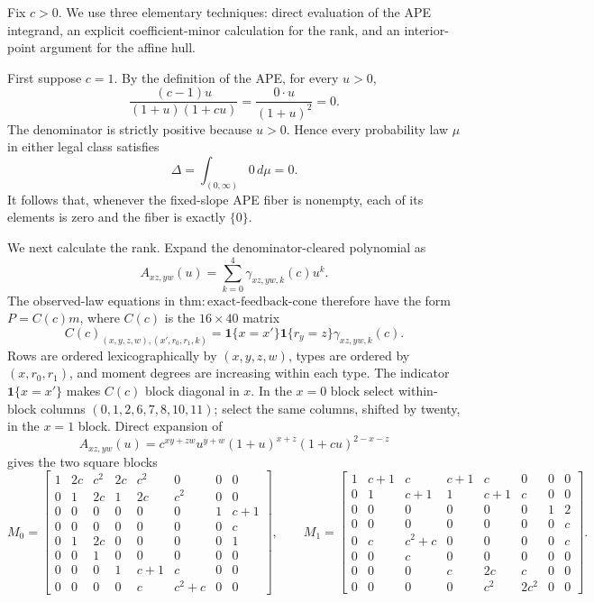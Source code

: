 Fix \(c>0\).  We use three elementary techniques: direct evaluation of the
APE integrand, an explicit coefficient-minor calculation for the rank, and an
interior-point argument for the affine hull.

First suppose \(c=1\).  By the definition of the APE, for every \(u>0\),
\[
 \frac{(c-1)u}{(1+u)(1+cu)}
 =\frac{0\cdot u}{(1+u)^2}=0.
\]
The denominator is strictly positive because \(u>0\).  Hence every probability
law \(\mu\) in either legal class satisfies
\[
 \Delta=\int_{(0,\infty)}0\,d\mu=0.
\]
It follows that, whenever the fixed-slope APE fiber is nonempty, each of its
elements is zero and the fiber is exactly \(\{0\}\).

We next calculate the rank.  Expand the denominator-cleared polynomial as
\[
 A_{xz,yw}(u)=\sum_{k=0}^4
 \gamma_{xz,yw,k}(c)u^k.
\]
The observed-law equations in \(\mathrm{thm{:}exact\text{-}feedback\text{-}cone}\)
therefore have the form \(P=C(c)m\), where \(C(c)\) is the
\(16\times40\) matrix
\[
 C(c)_{(x,y,z,w),(x',r_0,r_1,k)}
 =\mathbf 1\{x=x'\}\mathbf 1\{r_y=z\}
   \gamma_{xz,yw,k}(c).
\]
Rows are ordered lexicographically by \((x,y,z,w)\), types are ordered by
\((x,r_0,r_1)\), and moment degrees are increasing within each type.  The
indicator \(\mathbf 1\{x=x'\}\) makes \(C(c)\) block diagonal in \(x\).
In the \(x=0\) block select within-block columns
\((0,1,2,6,7,8,10,11)\); select the same columns, shifted by twenty, in the
\(x=1\) block.  Direct expansion of
\[
 A_{xz,yw}(u)=c^{xy+zw}u^{y+w}(1+u)^{x+z}
                 (1+cu)^{2-x-z}
\]
gives the two square blocks
\[
M_0=\begin{bmatrix}
1&2c&c^2&2c&c^2&0&0&0\\
0&1&2c&1&2c&c^2&0&0\\
0&0&0&0&0&0&1&c+1\\
0&0&0&0&0&0&0&c\\
0&1&2c&0&0&0&0&1\\
0&0&1&0&0&0&0&0\\
0&0&0&1&c+1&c&0&0\\
0&0&0&0&c&c^2+c&0&0
\end{bmatrix},
\qquad
M_1=\begin{bmatrix}
1&c+1&c&c+1&c&0&0&0\\
0&1&c+1&1&c+1&c&0&0\\
0&0&0&0&0&0&1&2\\
0&0&0&0&0&0&0&c\\
0&c&c^2+c&0&0&0&0&c\\
0&0&c&0&0&0&0&0\\
0&0&0&c&2c&c&0&0\\
0&0&0&0&c^2&2c^2&0&0
\end{bmatrix}.
\]
